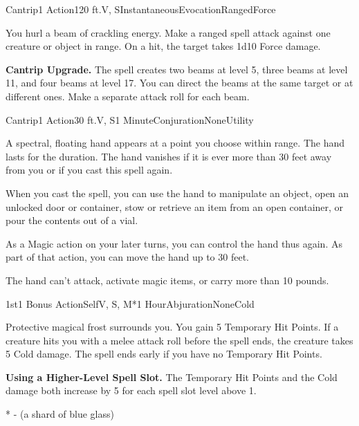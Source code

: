 


\pagestyle{empty}


\begin{Spell}{Cantrip}{1 Action}{120 ft.}{V, S}{Instantaneous}{Evocation}{Ranged}{Force}

You hurl a beam of crackling energy. Make a ranged spell attack against one creature or object in range. On a hit, the target takes 1d10 Force damage.

\textbf{Cantrip Upgrade.} The spell creates two beams at level 5, three beams at level 11, and four beams at level 17. You can direct the beams at the same target or at different ones. Make a separate attack roll for each beam.

\end{Spell}


\begin{Spell}{Cantrip}{1 Action}{30 ft.}{V, S}{1 Minute}{Conjuration}{None}{Utility}

A spectral, floating hand appears at a point you choose within range. The hand lasts for the duration. The hand vanishes if it is ever more than 30 feet away from you or if you cast this spell again.

When you cast the spell, you can use the hand to manipulate an object, open an unlocked door or container, stow or retrieve an item from an open container, or pour the contents out of a vial.

As a Magic action on your later turns, you can control the hand thus again. As part of that action, you can move the hand up to 30 feet.

The hand can't attack, activate magic items, or carry more than 10 pounds.

\end{Spell}


\begin{Spell}{1st}{1 Bonus Action}{Self}{V, S, M*}{1 Hour}{Abjuration}{None}{Cold}

Protective magical frost surrounds you. You gain 5 Temporary Hit Points. If a creature hits you with a melee attack roll before the spell ends, the creature takes 5 Cold damage. The spell ends early if you have no Temporary Hit Points.

\textbf{Using a Higher-Level Spell Slot.} The Temporary Hit Points and the Cold damage both increase by 5 for each spell slot level above 1.

* - (a shard of blue glass)

\end{Spell}

